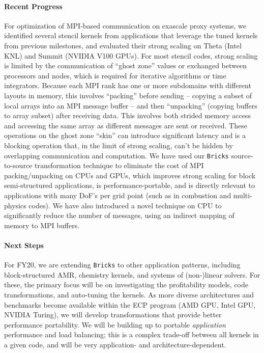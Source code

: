 \paragraph{Recent Progress}
For optimization of MPI-based communication on exascale proxy systems, 
  we identified several stencil kernels from applications that
  leverage the tuned kernels from previous milestones, and evaluated their
  strong scaling on Theta (Intel KNL) and Summit (NVIDIA V100 GPUs). 
For most stencil codes, strong scaling is
  limited by the communication of ``ghost zone'' values or exchanged between
  processors and nodes, which is required for iterative algorithms or time
  integrators. 
Because each MPI rank has one or more subdomains with different layouts 
  in memory, this involves ``packing'' before sending – copying a subset of
  local arrays into an MPI message buffer – and then ``unpacking'' 
  (copying buffers to array subset) after receiving data. 
This involves both strided memory access
  and accessing the same array as different messages are sent or received. 
These operations on the ghost zone ``skin'' can introduce significant latency 
  and is a blocking operation that, in the limit of strong scaling, 
  can’t be hidden by overlapping communication and computation. 
We have used our \texttt{Bricks} source-to-source transformation technique to 
  eliminate the cost of MPI packing/unpacking on CPUs and GPUs, which 
  improves strong scaling for block semi-structured applications, is 
  performance-portable, and is directly relevant to applications with many 
  DoF’s per grid point (such as in combustion and multi-physics codes). 
We have also introduced a novel technique on CPU to
  significantly reduce the number of messages, using an indirect mapping 
  of memory to MPI buffers. 


\paragraph{Next Steps}
For FY20, we are extending \texttt{Bricks} to other
  application patterns, including block-structured AMR, chemistry kernels,
  and systems of (non-)linear solvers.
For these, the primary focus will be on investigating the profitability
  models, code transformations, and auto-tuning the kernels.
As more diverse architectures and benchmarks become available within 
  the ECP program (AMD GPU, Intel GPU, NVIDIA Turing), we will develop 
  transformations that provide better performance portability.
We will be building up to portable \textit{application} performance 
  and load balancing; this is a complex trade-off between all kernels in
  a given code, and will be very application- and architecture-dependent.

  

%
